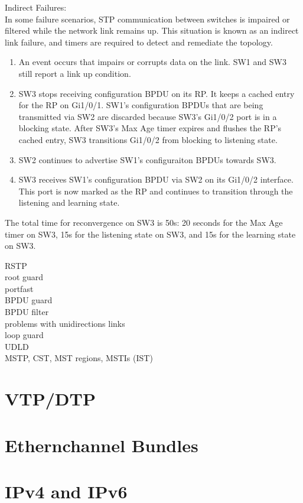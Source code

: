 \documentclass[parindent=0pt]{article}
\begin{document}
	Indirect Failures:\\
		In some failure scenarios, STP communication between switches is impaired or filtered while the network link remains up. This situation is known as an indirect link failure, and timers are required to detect and remediate the topology.
		\begin{enumerate}
			\item An event occurs that impairs or corrupts data on the link. SW1 and SW3 still report a link up condition.
			\item SW3 stops receiving configuration BPDU on its RP. It keeps a cached entry for the RP on Gi1/0/1. SW1's configuration BPDUs that are being transmitted via SW2 are discarded because SW3's Gi1/0/2 port is in a blocking state.
			After SW3's Max Age timer expires and flushes the RP's cached entry, SW3 transitions Gi1/0/2 from blocking to listening state.	
			\item SW2 continues to advertise SW1's configuraiton BPDUs towards SW3.
			\item SW3 receives SW1's configuration BPDU via SW2 on its Gi1/0/2 interface. This port is now marked as the RP and continues to transition through the listening and learning state.
		\end{enumerate}

	The total time for reconvergence on SW3 is 50s: 20 seconds for the Max Age timer on SW3, 15s for the listening state on SW3, and 15s for the learning state on SW3.

RSTP\\

root guard\\
portfast\\
BPDU guard\\
BPDU filter\\
problems with unidirections links\\
loop guard\\
UDLD\\
MSTP, CST, MST regions, MSTIs (IST)\\  


\section*{VTP/DTP}
\section*{Ethernchannel Bundles}


\section*{IPv4 and IPv6}
\end{document}
